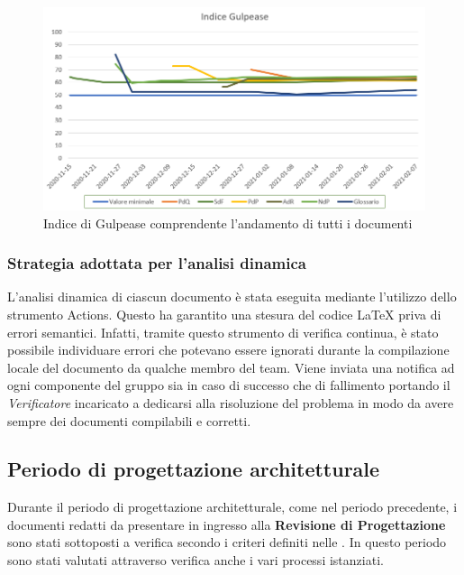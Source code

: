 \begin{figure}[ht]
	\centering
	\includegraphics[scale=0.6]{Immagini/Gulpease_v1.1}
	\caption{Indice di Gulpease comprendente l'andamento di tutti i documenti}
	\label{fig:gulpease}
\end{figure}
\newpage
\subsubsection{Strategia adottata per l'analisi dinamica}
L'analisi dinamica di ciascun documento è stata eseguita mediante l'utilizzo dello strumento  Actions. Questo ha garantito una stesura del codice \LaTeX{} priva di errori semantici. Infatti, tramite questo strumento di verifica continua, è stato possibile individuare errori che potevano essere ignorati durante la compilazione locale del documento da qualche membro del team. Viene inviata una notifica ad ogni componente del gruppo sia in caso di successo che di fallimento portando il \textit{Verificatore} incaricato a dedicarsi alla risoluzione del problema in modo da avere sempre dei documenti compilabili e corretti.

\subsection{Periodo di progettazione architetturale}
Durante il periodo di progettazione architetturale, come nel periodo precedente, i documenti redatti da presentare in ingresso alla \textbf{Revisione di Progettazione} sono stati sottoposti a verifica secondo i criteri definiti nelle . In questo periodo sono stati valutati attraverso verifica anche i vari processi istanziati.
